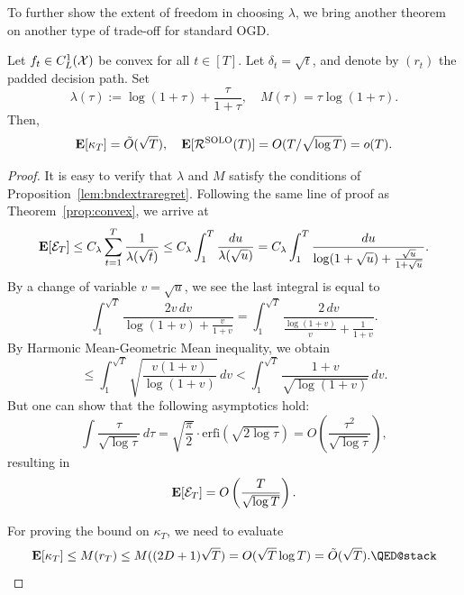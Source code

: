 To further show the extent of freedom in choosing $\lambda$, we bring another theorem on another type of trade-off for standard OGD.
\begin{theorem}
   Let $f_t\in C^1_L(\mathcal{X})$ be convex for all $t\in[T]$. Let $\delta_t = \sqrt{t}$, and denote by $(r_t)$ the padded decision path. Set
  \[
      \lambda(\tau) := \log(1+\tau) + \frac{\tau}{1+\tau}, \quad M(\tau) = \tau\log(1 + \tau).
  \]
  Then,
  \[
      \mathbf{E}[\kappa_T] = \tilde{O}(\sqrt{T}),\quad \mathbf{E}[\mathcal{R}^{\mathrm{SOLO}}(T)] = O(T/\sqrt{\log T}) = o(T).
  \]
\end{theorem}
\begin{proof}
    It is easy to verify that $\lambda$ and $M$ satisfy the conditions of Proposition~\ref{lem:bndextraregret}.  Following the same line of proof as Theorem~\ref{prop:convex}, we arrive at 
    \[
        \mathbf{E}[\mathcal{E}_T] \leq C_\lambda\sum_{t=1}^T \frac{1}{\lambda(\sqrt{t})} \leq C_\lambda\int_1^T \frac{du}{\lambda(\sqrt{u})} = C_\lambda \int_1^T \frac{du}{\log(1+ \sqrt{u}) + \frac{\sqrt{u}}{1+\sqrt{u}}}.
    \]
    By a change of variable $v = \sqrt{u}$, we see the last integral is equal to
    \[
        \int_1^{\sqrt{T}} \frac{2v\,dv}{\log(1+v) + \frac{v}{1+v}} = 
        \int_1^{\sqrt{T}} \frac{2\,dv}{\frac{\log(1+v)}{v} + \frac{1}{1+v}}.
    \]
    By Harmonic Mean-Geometric Mean inequality, we obtain
    \[
        \leq  \int_1^{\sqrt{T}} \sqrt{\frac{v(1+v)}{\log(1+v)}}\,dv < \int_1^{\sqrt{T}} \frac{1+v}{\sqrt{\log(1+v)}}\,dv.
    \]
    But one can show that the following asymptotics hold:
    \[
        \int \frac{\tau}{\sqrt{\log \tau}}\,d\tau = \sqrt{\frac{\pi}{2}}\cdot\mathrm{erfi}(\sqrt{2\log \tau}) = O\left(\frac{\tau^2}{\sqrt{\log \tau}}\right),
    \]
    resulting in
    \[
        \mathbf{E}[\mathcal{E}_T] = O\left(\frac{T}{\sqrt{\log T}}\right).
    \]

    For proving the bound on $\kappa_T$, we need to evaluate 
    \[
        \ev[\kappa_T] \leq M(r_T) \leq M((2D + 1)\sqrt{T}) = O(\sqrt{T}\log T) = \tilde{O}(\sqrt{T}). \qedhere
    \]
\end{proof}

